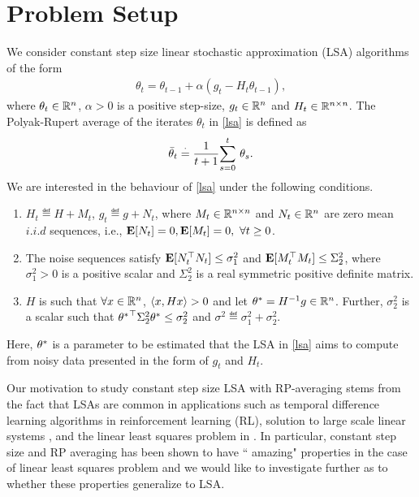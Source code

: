 \section{Problem Setup}\label{sec:prob}
%
We consider constant step size linear stochastic approximation (LSA) algorithms of the form
\begin{align}\label{lsa}
\theta_{t}=\theta_{t-1}+\alpha(g_t-H_t\theta_{t-1}),
\end{align}
where $\theta_t\in \R^n$, $\alpha>0$ is a positive step-size, $g_t\in \R^n$ and $H_t\in \R^{n\times n}$. The Polyak-Rupert average of the iterates $\theta_t$ in \eqref{lsa} is defined as
\begin{align}\label{rp} \tb_t\eqdef \frac{1}{t+1}\ous{\sum}{s=0}{t} \theta_s. \end{align}
We are interested in the behaviour of \eqref{lsa} under the following conditions.
\begin{assumption}\label{genlsa}
\begin{enumerate}
\item\label{mart} $H_t\eqdef H+M_t$, $g_t\eqdef g+N_t$, where $M_t\in \R^{n\times n}$ and $N_t\in \R^n$ are zero mean $i.i.d$ sequences, i.e., $\E[N_t]=0,\E[M_t]=0,~\forall t\geq 0$.
\item \label{noise} The noise sequences satisfy $\E[N_t^\top N_t]\leq \sigma_1^2$ and $\E[M_t^\top M_t]\leq \Sigma_2^2$, where $\sigma_1^2>0$ is a positive scalar and $\Sigma^2_2$ is a real symmetric positive definite matrix.
\item \label{mat} $H$ is such that $\forall x\in \R^n$, $\ip{x,Hx}>0$ and let $\ts=H^{-1}g\in\R^n$. Further, $\sigma_2^2$ is a scalar such that ${\ts}^\top\Sigma_2^2\ts\leq \sigma_2^2$ and $\sigma^2\eqdef\sigma_1^2+\sigma_2^2$.
\end{enumerate}
\end{assumption}
Here, $\ts$ is a parameter to be estimated that the LSA in \eqref{lsa} aims to compute from noisy data presented in the form of $g_t$ and $H_t$.\par
Our motivation to study constant step size LSA with RP-averaging stems from the fact that LSAs are common in applications such as temporal difference learning algorithms \cite{td} in reinforcement learning (RL)\cite{rl}, solution to large scale linear systems \cite{bertsekas}, and the linear least squares problem in \cite{bachharder}. In particular, constant step size and RP averaging has been shown to have `` amazing" properties in the case of linear least squares problem \cite{bachharder} and we would like to investigate further as to whether these properties generalize to LSA.
